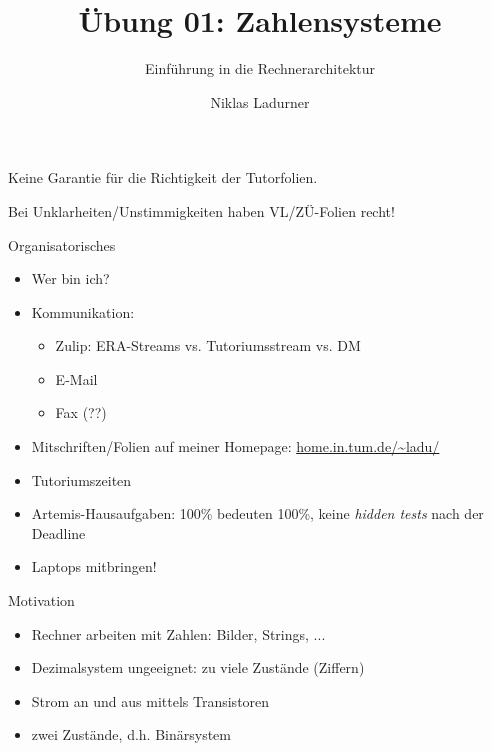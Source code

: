 \documentclass[
  german,            %
  aspectratio=169,    %
]{tumbeamer}
\title{Übung 01: Zahlensysteme}
\subtitle{Einführung in die Rechnerarchitektur}
\author{Niklas Ladurner}
\institute{\theChairName\\\theDepartmentName\\\theUniversityName}
\date{\DTMdisplaydate{2025}{10}{17}{-1}}
\begin{document}
\maketitle

\begin{frame}[c]{}{}
  \begin{center}
    \LARGE  Keine Garantie für die Richtigkeit der Tutorfolien.

    \Large Bei Unklarheiten/Unstimmigkeiten haben VL/ZÜ-Folien recht!
  \end{center}
\end{frame}

\begin{frame}[c]{Organisatorisches}{}
  \begin{itemize}
    \item Wer bin ich?
    \item Kommunikation:
          \begin{itemize}
            \item Zulip: ERA-Streams vs. Tutoriumsstream vs. DM
            \item E-Mail
            \item Fax (??)
          \end{itemize}
    \item Mitschriften/Folien auf meiner Homepage: \url{home.in.tum.de/~ladu/}
    \item Tutoriumszeiten
    \item Artemis-Hausaufgaben: 100\% bedeuten 100\%, keine \emph{hidden tests} nach der Deadline
    \item Laptops mitbringen!
  \end{itemize}
\end{frame}

\begin{frame}[c]{Motivation}{}
  \begin{itemize}
    \item Rechner arbeiten mit Zahlen: Bilder, Strings, ...
    \item Dezimalsystem ungeeignet: zu viele Zustände (Ziffern)
    \item Strom an und aus mittels Transistoren
    \item zwei Zustände, d.h. Binärsystem
  \end{itemize}
\end{frame}
\end{document}
